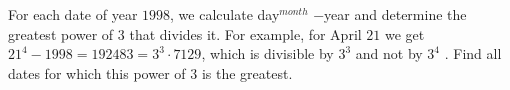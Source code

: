 For each date of year $1998$, we calculate day$^{month}$ −year and determine the greatest power of $3$ that divides it. For example, for April $21$ we get $21^4 - 1998 =192483 = 3^3 \cdot 7129$, which is divisible by $3^3$ and not by $3^4$ . Find all dates for which this power of $3$ is the greatest.